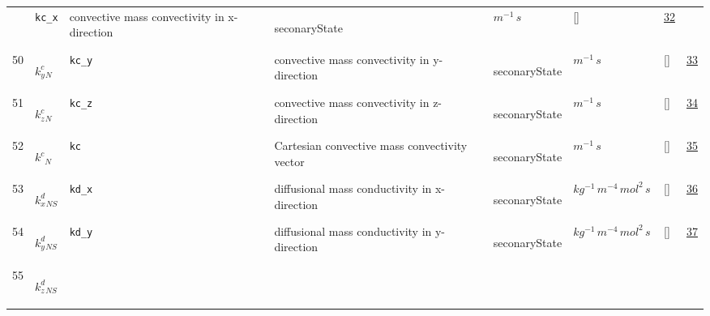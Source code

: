 \begin{longtable}{|p{1cm}|p{3cm}|p{3cm}|p{7cm}|p{3.0cm}|p{3cm}|p{2cm}|p{1cm}|}
             & \verb|kc_x|
             & convective mass convectivity in x-direction
             & \begin{lay}seconaryState \end{lay}
             & $ m^{-1} \,s \, $
             & []
             & \hyperlink{"e:32"}{ 32 }
                 \\
    50
             & \hypertarget{"v:50"}{ $ {k^{c}_{y}}{_{N}} $}
             & \verb|kc_y|
             & convective mass convectivity in y-direction
             & \begin{lay}seconaryState \end{lay}
             & $ m^{-1} \,s \, $
             & []
             & \hyperlink{"e:33"}{ 33 }
                 \\
    51
             & \hypertarget{"v:51"}{ $ {k^{c}_{z}}{_{N}} $}
             & \verb|kc_z|
             & convective mass convectivity in z-direction
             & \begin{lay}seconaryState \end{lay}
             & $ m^{-1} \,s \, $
             & []
             & \hyperlink{"e:34"}{ 34 }
                 \\
    52
             & \hypertarget{"v:52"}{ $ {k^{c}}{_{N}} $}
             & \verb|kc|
             & Cartesian convective mass convectivity vector
             & \begin{lay}seconaryState \end{lay}
             & $ m^{-1} \,s \, $
             & []
             & \hyperlink{"e:35"}{ 35 }
                 \\
    53
             & \hypertarget{"v:53"}{ $ {k^{d}_{x}}{_{{N S}}} $}
             & \verb|kd_x|
             & diffusional mass conductivity in x-direction
             & \begin{lay}seconaryState \end{lay}
             & $ kg^{-1} \,m^{-4} \,mol^{2} \,s \, $
             & []
             & \hyperlink{"e:36"}{ 36 }
                 \\
    54
             & \hypertarget{"v:54"}{ $ {k^{d}_{y}}{_{{N S}}} $}
             & \verb|kd_y|
             & diffusional mass conductivity in y-direction
             & \begin{lay}seconaryState \end{lay}
             & $ kg^{-1} \,m^{-4} \,mol^{2} \,s \, $
             & []
             & \hyperlink{"e:37"}{ 37 }
                 \\
    55
             & \hypertarget{"v:55"}{ $ {k^{d}_{z}}{_{{N S}}} $}

\end{longtable}
